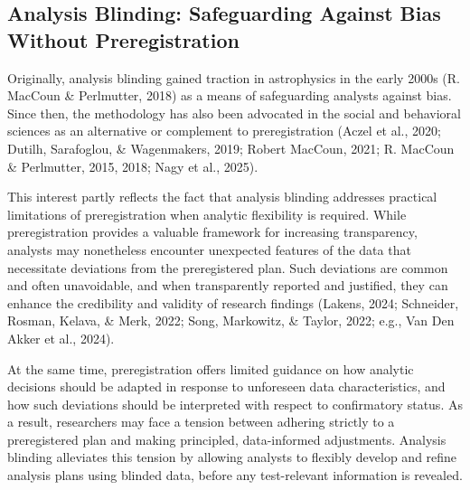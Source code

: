 \documentclass[
  english,
  man,floatsintext]{apa6}
\begin{document}
\subsection{Analysis Blinding: Safeguarding Against Bias Without Preregistration}\label{analysis-blinding-safeguarding-against-bias-without-preregistration}

Originally, analysis blinding gained traction in astrophysics in the early 2000s (R. MacCoun \& Perlmutter, 2018) as a means of safeguarding analysts against bias. Since then, the methodology has also been advocated in the social and behavioral sciences as an alternative or complement to preregistration (Aczel et al., 2020; Dutilh, Sarafoglou, \& Wagenmakers, 2019; Robert MacCoun, 2021; R. MacCoun \& Perlmutter, 2015, 2018; Nagy et al., 2025).

This interest partly reflects the fact that analysis blinding addresses practical limitations of preregistration when analytic flexibility is required. While preregistration provides a valuable framework for increasing transparency, analysts may nonetheless encounter unexpected features of the data that necessitate deviations from the preregistered plan. Such deviations are common and often unavoidable, and when transparently reported and justified, they can enhance the credibility and validity of research findings (Lakens, 2024; Schneider, Rosman, Kelava, \& Merk, 2022; Song, Markowitz, \& Taylor, 2022; e.g., Van Den Akker et al., 2024).

At the same time, preregistration offers limited guidance on how analytic decisions should be adapted in response to unforeseen data characteristics, and how such deviations should be interpreted with respect to confirmatory status. As a result, researchers may face a tension between adhering strictly to a preregistered plan and making principled, data-informed adjustments. Analysis blinding alleviates this tension by allowing analysts to flexibly develop and refine analysis plans using blinded data, before any test-relevant information is revealed.
\end{document}
